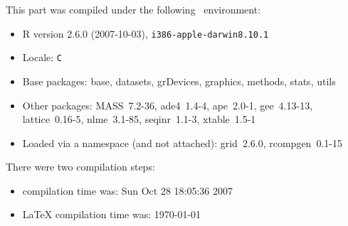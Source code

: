 \documentclass{article}
\begin{document}
This part was compiled under the following \Rlogo{}~environment:

\begin{itemize}
  \item R version 2.6.0 (2007-10-03), \verb|i386-apple-darwin8.10.1|
  \item Locale: \verb|C|
  \item Base packages: base, datasets, grDevices, graphics, methods,
    stats, utils
  \item Other packages: MASS~7.2-36, ade4~1.4-4, ape~2.0-1,
    gee~4.13-13, lattice~0.16-5, nlme~3.1-85, seqinr~1.1-3,
    xtable~1.5-1
  \item Loaded via a namespace (and not attached): grid~2.6.0,
    rcompgen~0.1-15
\end{itemize}
There were two compilation steps:

\begin{itemize}
  \item \Rlogo{} compilation time was: Sun Oct 28 18:05:36 2007
  \item \LaTeX{} compilation time was: \today
\end{itemize}


\clearpage
{}


\end{document}
